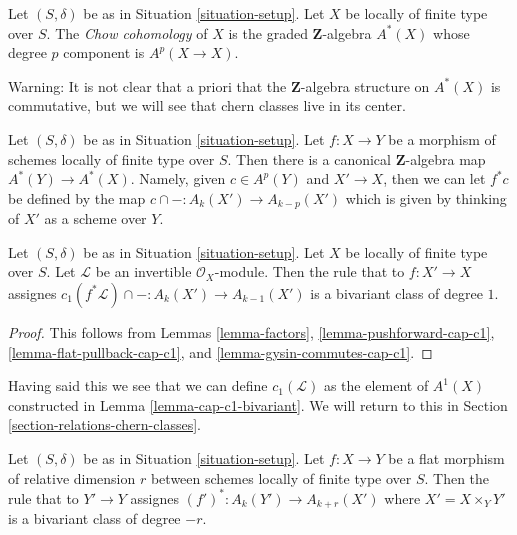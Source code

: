 \begin{definition}
\label{definition-chow-cohomology}
Let $(S, \delta)$ be as in Situation \ref{situation-setup}.
Let $X$ be locally of finite type over $S$. The {\it Chow cohomology}
of $X$ is the graded $\mathbf{Z}$-algebra $A^*(X)$ whose degree
$p$ component is $A^p(X \to X)$.
\end{definition}

\noindent
Warning: It is not clear that a priori that the $\mathbf{Z}$-algebra structure
on $A^*(X)$ is commutative, but we will see that chern classes live
in its center.

\begin{remark}
\label{remark-pullback-cohomology}
Let $(S, \delta)$ be as in Situation \ref{situation-setup}.
Let $f : X \to Y$ be a morphism of schemes locally of finite type over $S$.
Then there is a canonical $\mathbf{Z}$-algebra map $A^*(Y) \to A^*(X)$.
Namely, given $c \in A^p(Y)$ and $X' \to X$, then we can let $f^*c$
be defined by the map $c \cap - : A_k(X') \to A_{k - p}(X')$ which is
given by thinking of $X'$ as a scheme over $Y$.
\end{remark}

\begin{lemma}
\label{lemma-cap-c1-bivariant}
Let $(S, \delta)$ be as in Situation \ref{situation-setup}.
Let $X$ be locally of finite type over $S$.
Let $\mathcal{L}$ be an invertible $\mathcal{O}_X$-module.
Then the rule that to $f : X' \to X$ assignes
$c_1(f^*\mathcal{L}) \cap - : A_k(X') \to A_{k - 1}(X')$
is a bivariant class of degree $1$.
\end{lemma}

\begin{proof}
This follows from Lemmas \ref{lemma-factors},
\ref{lemma-pushforward-cap-c1},
\ref{lemma-flat-pullback-cap-c1}, and
\ref{lemma-gysin-commutes-cap-c1}.
\end{proof}

\noindent
Having said this we see that we can define $c_1(\mathcal{L})$ as the element
of $A^1(X)$ constructed in Lemma \ref{lemma-cap-c1-bivariant}.
We will return to this in Section \ref{section-relations-chern-classes}.

\begin{lemma}
\label{lemma-flat-pullback-bivariant}
Let $(S, \delta)$ be as in Situation \ref{situation-setup}.
Let $f : X \to Y$ be a flat morphism of relative dimension $r$
between schemes locally of finite type over $S$.
Then the rule that to $Y' \to Y$ assignes
$(f')^* : A_k(Y') \to A_{k + r}(X')$ where $X' = X \times_Y Y'$
is a bivariant class of degree $-r$.
\end{lemma}

